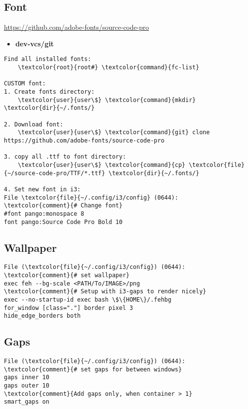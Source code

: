 \documentclass[10pt, a4paper, onecolumn, openany]{book}         %
\begin{document}
\subsection{Font}
\underline{\url{https://github.com/adobe-fonts/source-code-pro}}

\begin{itemize}
    \item \textbf{dev-vcs/git}
\end{itemize}


\begin{Verbatim}[commandchars=\\\{\}]
Find all installed fonts:
    \textcolor{root}{root#} \textcolor{command}{fc-list}

CUSTOM font:
1. Create fonts directory:
    \textcolor{user}{user\$} \textcolor{command}{mkdir} \textcolor{dir}{~/.fonts/}
 
2. Download font:
    \textcolor{user}{user\$} \textcolor{command}{git} clone https://github.com/adobe-fonts/source-code-pro
    
3. copy all .ttf to font directory:
    \textcolor{user}{user\$} \textcolor{command}{cp} \textcolor{file}{~/source-code-pro/TTF/*.ttf} \textcolor{dir}{~/.fonts/}

4. Set new font in i3:
File \textcolor{file}{~/.config/i3/config} (0644):
\textcolor{comment}{# Change font}
#font pango:monospace 8
font pango:Source Code Pro Bold 10
\end{Verbatim}


\subsection{Wallpaper}
\begin{Verbatim}[commandchars=\\\{\}]
File (\textcolor{file}{~/.config/i3/config}) (0644):
\textcolor{comment}{# set wallpaper}
exec feh --bg-scale <PATH/To/IMAGE>/png
\textcolor{comment}{# Setup with i3-gaps to render nicely}
exec --no-startup-id exec bash \$\{HOME\}/.fehbg
for_window [class="."] border pixel 3
hide_edge_borders both
\end{Verbatim}


\subsection{Gaps}
\begin{Verbatim}[commandchars=\\\{\}]
File (\textcolor{file}{~/.config/i3/config}) (0644):
\textcolor{comment}{# set gaps for between windows}
gaps inner 10
gaps outer 10
\textcolor{comment}{Add gaps only, when container > 1}
smart_gaps on
\end{Verbatim}
\end{document}
